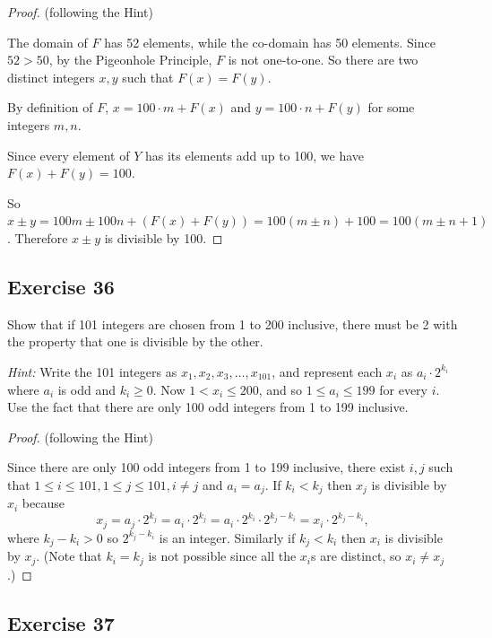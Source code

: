 \documentclass[14pt]{extarticle}
\begin{document}
\begin{proof}
     (following the Hint)

     The domain of \(F\) has 52 elements, while the co-domain has 50 elements. Since \(52 > 50\), by the Pigeonhole
     Principle, \(F\) is not one-to-one. So there are two distinct integers \(x,y\) such that \(F(x) = F(y)\).

     By definition of \(F\), \(x = 100 \cdot m + F(x)\) and \(y = 100 \cdot n + F(y)\) for some integers \(m,n\).

     Since every element of \(Y\) has its elements add up to 100, we have \(F(x) + F(y) = 100\).

     So \(x \pm y = 100m \pm 100n + (F(x) + F(y)) = 100(m \pm n) + 100 = 100(m \pm n+1)\). Therefore \(x \pm y\) is
     divisible by 100.
\end{proof}

\subsection{Exercise 36}
Show that if 101 integers are chosen from 1 to 200 inclusive, there must be 2 with the property that one is
divisible by the other.

     {\it Hint:} Write the 101 integers as \(x_1, x_2, x_3, \ldots, x_{101}\), and represent each \(x_i\) as
\(a_i \cdot 2^{k_i}\) where \(a_i\) is odd and \(k_i \geq 0\). Now \(1 < x_i \leq 200\), and so \(1 \leq a_i \leq
199\) for every \(i\). Use the fact that there are only 100 odd integers from 1 to 199 inclusive.

\begin{proof}
     (following the Hint)

     Since there are only 100 odd integers from 1 to 199 inclusive, there exist \(i, j\) such that \(1 \leq i \leq
     101, 1 \leq j \leq 101, i \neq j\) and \(a_i = a_j\). If \(k_i < k_j\) then \(x_j\) is divisible by \(x_i\) because
     \[
          x_j = a_j \cdot 2^{k_j} = a_i \cdot 2^{k_j} = a_i \cdot 2^{k_i} \cdot 2^{k_j-k_i} = x_i \cdot 2^{k_j-k_i},
     \]
     where \(k_j - k_i > 0\) so \(2^{k_j-k_i}\) is an integer. Similarly if \(k_j < k_i\) then \(x_i\) is divisible by
     \(x_j\). (Note that \(k_i = k_j\) is not possible since all the \(x_i\)s are distinct, so \(x_i \neq x_j\).)
\end{proof}

\subsection{Exercise 37}
\end{document}
